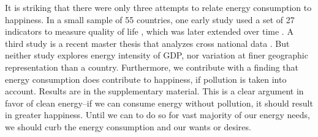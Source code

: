 \documentclass[10pt, letterpaper]{article}
\begin{document}
\begin{spacing}{1.4}
It is striking that there were only three  attempts to
relate energy consumption to happiness.   %
 In a small sample of 55 countries, one early study used a set of 27 indicators to measure
 quality of life \cite{mazur74}, which was later extended over time \cite{mazur11}.
 A third study is a recent master
 thesis that  analyzes cross national data \cite{winfrey13}. But neither
 study  explores energy intensity of GDP, nor variation at finer geographic representation than a country.
Furthermore, we contribute with a finding that energy consumption does contribute to happiness, if pollution is
taken into account. Results are in the supplementary material. This is a clear argument in favor of clean energy--if we can
consume energy without pollution, it should result in greater happiness. Until
we can to do so for vast majority of our energy needs, we should curb the energy consumption and
our wants or desires.





\end{spacing}
\end{document}
